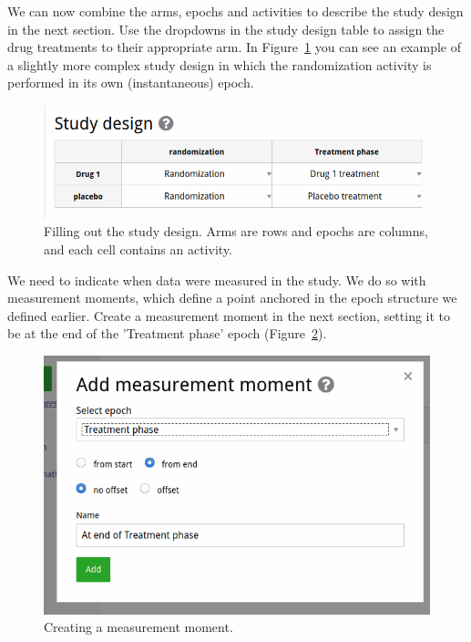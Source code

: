 \documentclass[12pt]{article}
\begin{document}
We can now combine the arms, epochs and activities to describe the study design in the next section. Use the dropdowns in the study design table to assign the drug treatments to their appropriate arm. In Figure~\ref{fig:studyDesign} you can see an example of a slightly more complex study design in which the randomization activity is performed in its own (instantaneous) epoch.

\begin{figure}[!htbp]
  \centering
  \includegraphics[width=\textwidth]{img/studyDesign.png}
  \caption{Filling out the study design. Arms are rows and epochs are columns, and each cell contains an activity.}
\label{fig:studyDesign}
\end{figure}

We need to indicate when data were measured in the study. We do so with measurement moments, which define a point anchored in the epoch structure we defined earlier. Create a measurement moment in the next section, setting it to be at the end of the 'Treatment phase' epoch (Figure~\ref{fig:addMeasurementMoment}).

\begin{figure}[!htbp]
  \centering
  \includegraphics[width=\textwidth]{img/addMeasurementMoment.png}
  \caption{Creating a measurement moment.}
\label{fig:addMeasurementMoment}
\end{figure}
\end{document}
